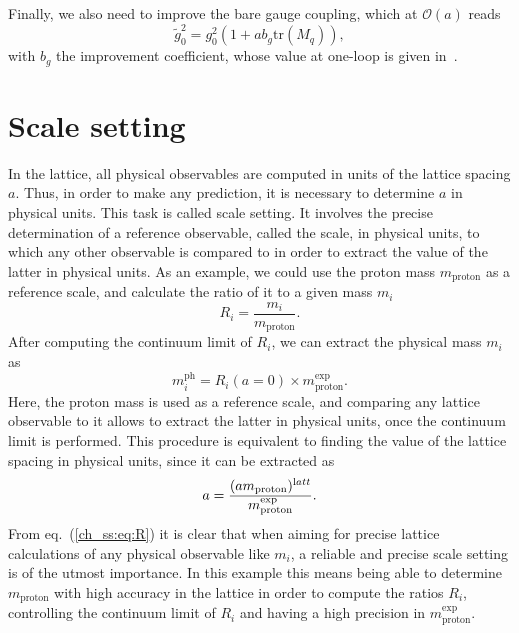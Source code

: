 Finally, we also need to improve the bare gauge coupling, which at $\mathcal{O}(a)$ reads
\begin{equation}
\tilde{g}_0^2=g_0^2\left(1+ab_g{\textrm{tr}}\left(M_q\right)\right),
\end{equation}
with $b_g$ the improvement coefficient, whose value at one-loop is given in~\citep{Luscher:1996sc}.


\section{Scale setting}
\label{ch_foundation:sec:ss}

In the lattice, all physical observables are computed in units of the lattice spacing $a$. Thus, in order to make any prediction, it is necessary to determine $a$ in physical units. This task is called scale setting. It involves the precise determination of a reference observable, called the scale, in physical units, to which any other observable is compared to in order to extract the value of the latter in physical units. As an example, we could use the proton mass $m_{\textrm{proton}}$ as a reference scale, and calculate the ratio of it to a given mass $m_i$
\begin{equation}
R_i=\frac{m_i}{m_{\textrm{proton}}}.
\end{equation}
After computing the continuum limit of $R_i$, we can extract the physical mass $m_i$ as
\begin{equation}
\label{ch_ss:eq:R}
m_i^{\textrm{ph}}=R_i(a=0)\times m_{\textrm{proton}}^{\textrm{exp}}.
\end{equation}
Here, the proton mass is used as a reference scale, and comparing any lattice observable to it allows to extract the latter in physical units, once the continuum limit is performed. This procedure is equivalent to finding the value of the lattice spacing in physical units, since it can be extracted as 
\begin{equation}
a=\frac{(am_{\textrm{proton}})^{\textrm latt}}{m_{\textrm{proton}}^{\textrm{exp}}}.
\end{equation}
From eq.~(\ref{ch_ss:eq:R}) it is clear that when aiming for precise lattice calculations of any physical observable like $m_i$, a reliable and precise scale setting is of the utmost importance. In this example this means being able to determine $m_{\textrm{proton}}$ with high accuracy in the lattice in order to compute the ratios $R_i$, controlling the continuum limit of $R_i$ and having a high precision in $m_{\textrm{proton}}^{\textrm{exp}}$.


